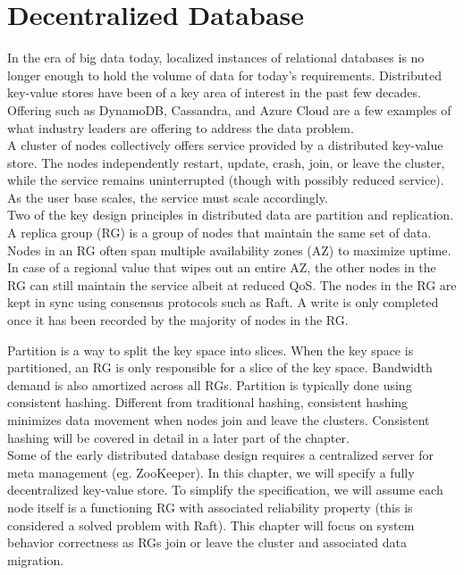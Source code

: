 % 

\usetikzlibrary{arrows.meta} %

\chapter{Decentralized Database}

In the era of big data today, localized instances of relational databases is no
longer enough to hold the volume of data for today's requirements. Distributed
key-value stores have been of a key area of interest in the past few decades. 
Offering such as DynamoDB, Cassandra, and Azure Cloud are a few examples of what
industry leaders are offering to address the data problem.\\

A cluster of nodes collectively offers service provided by a distributed
key-value store. The nodes independently restart, update, crash, join, or leave
the cluster, while the service remains uninterrupted (though with possibly
reduced service). As the user base scales, the service must scale
accordingly.\\

Two of the key design principles in distributed data are partition and
replication.\\

A replica group (RG) is a group of nodes that maintain the same set of data.
Nodes in an RG often span multiple availability zones (AZ) to maximize uptime.
In case of a regional value that wipes out an entire AZ, the other nodes in the
RG can still maintain the service albeit at reduced QoS. The nodes in the RG are
kept in sync using consensus protocols such as Raft. A write is only
completed once it has been recorded by the
majority of nodes in the RG.

Partition is a way to split the key space into slices. When the key space is
partitioned, an RG is only responsible for a slice of the key space. Bandwidth
demand is also amortized across all RGs. Partition is typically done using 
consistent hashing. Different from traditional hashing, consistent hashing
minimizes data movement when nodes join and leave the clusters. Consistent
hashing will be covered in detail in a later part of the chapter.\\

Some of the early distributed database design requires a centralized server for
meta management (eg. ZooKeeper). In this chapter, we will specify a fully
decentralized key-value store. To simplify the specification, we will assume 
each node itself is a functioning RG with associated reliability property (this
is considered a solved problem with Raft). This chapter will focus on system
behavior correctness as RGs join or leave the cluster and associated data
migration.

